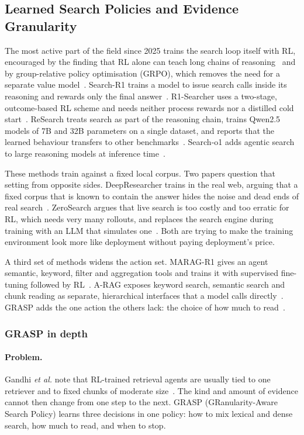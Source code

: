 \documentclass[pdflatex,sn-mathphys-num]{sn-jnl}%
\begin{document}
\subsection{Learned Search Policies and Evidence Granularity}
\label{sec:policies}
The most active part of the field since 2025 trains the search loop itself with RL, encouraged by the finding that RL alone can teach long chains of reasoning~\cite{deepseek2025r1} and by group-relative policy optimisation (GRPO), which removes the need for a separate value model~\cite{shao2024deepseekmath}. Search-R1 trains a model to issue search calls inside its reasoning and rewards only the final answer~\cite{jin2025searchr1}. R1-Searcher uses a two-stage, outcome-based RL scheme and needs neither process rewards nor a distilled cold start~\cite{song2025r1searcher}. ReSearch treats search as part of the reasoning chain, trains Qwen2.5 models of 7B and 32B parameters on a single dataset, and reports that the learned behaviour transfers to other benchmarks~\cite{chen2025research}. Search-o1 adds agentic search to large reasoning models at inference time~\cite{li2025searcho1}.

These methods train against a fixed local corpus. Two papers question that setting from opposite sides. DeepResearcher trains in the real web, arguing that a fixed corpus that is known to contain the answer hides the noise and dead ends of real search~\cite{zheng2025deepresearcher}. ZeroSearch argues that live search is too costly and too erratic for RL, which needs very many rollouts, and replaces the search engine during training with an LLM that simulates one~\cite{sun2025zerosearch}. Both are trying to make the training environment look more like deployment without paying deployment's price.

A third set of methods widens the action set. MARAG-R1 gives an agent semantic, keyword, filter and aggregation tools and trains it with supervised fine-tuning followed by RL~\cite{luo2025maragr1}. A-RAG exposes keyword search, semantic search and chunk reading as separate, hierarchical interfaces that a model calls directly~\cite{du2026arag}. GRASP adds the one action the others lack: the choice of how much to read~\cite{gandhi2026grasp}.

\subsubsection{GRASP in depth}
\label{sec:grasp}
\paragraph{Problem.} Gandhi \textit{et al.} note that RL-trained retrieval agents are usually tied to one retriever and to fixed chunks of moderate size~\cite{gandhi2026grasp}. The kind and amount of evidence cannot then change from one step to the next. GRASP (GRanularity-Aware Search Policy) learns three decisions in one policy: how to mix lexical and dense search, how much to read, and when to stop.
\end{document}
